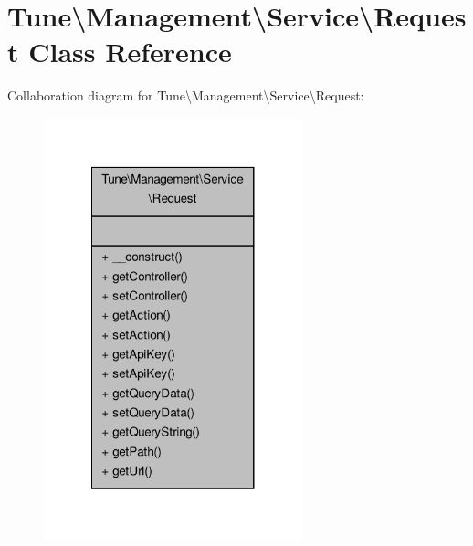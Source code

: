 \hypertarget{classTune_1_1Management_1_1Service_1_1Request}{\section{Tune\textbackslash{}Management\textbackslash{}Service\textbackslash{}Request Class Reference}
\label{classTune_1_1Management_1_1Service_1_1Request}
}


Collaboration diagram for Tune\textbackslash{}Management\textbackslash{}Service\textbackslash{}Request\-:
\nopagebreak
\begin{figure}[H]
\begin{center}
\leavevmode
\includegraphics[width=212pt]{classTune_1_1Management_1_1Service_1_1Request__coll__graph}
\end{center}
\end{figure}
